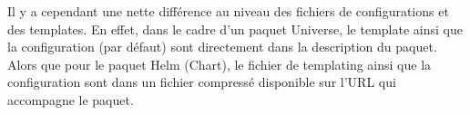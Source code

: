 \documentclass[11pt,fleqn]{book} %
\begin{document}
Il y a cependant une nette différence au niveau des fichiers de configurations et des templates. En effet, dans le cadre d'un paquet Universe, le template ainsi que la configuration (par défaut) sont directement dans la description du paquet. Alors que pour le paquet Helm (Chart), le fichier de templating ainsi que la configuration sont dans un fichier compressé disponible sur l'URL qui accompagne le paquet. \\



\end{document}
